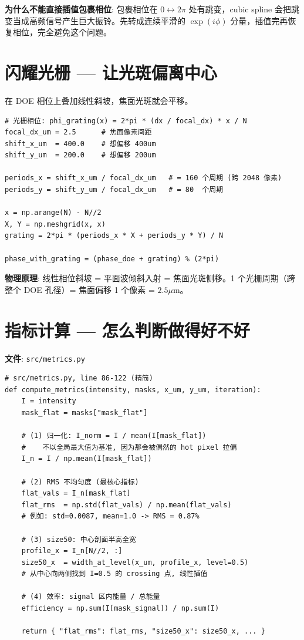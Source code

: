 \documentclass[11pt,a4paper]{ctexart}
\begin{document}
\textbf{为什么不能直接插值包裹相位}: 包裹相位在 $0 \leftrightarrow 2\pi$ 处有跳变，cubic spline 会把跳变当成高频信号产生巨大振铃。先转成连续平滑的 $\exp(i\phi)$ 分量，插值完再恢复相位，完全避免这个问题。

\section{闪耀光栅 — 让光斑偏离中心}

在 DOE 相位上叠加线性斜坡，焦面光斑就会平移。

\begin{lstlisting}
# 光栅相位: phi_grating(x) = 2*pi * (dx / focal_dx) * x / N
focal_dx_um = 2.5      # 焦面像素间距
shift_x_um  = 400.0    # 想偏移 400um
shift_y_um  = 200.0    # 想偏移 200um

periods_x = shift_x_um / focal_dx_um   # = 160 个周期 (跨 2048 像素)
periods_y = shift_y_um / focal_dx_um   # = 80  个周期

x = np.arange(N) - N//2
X, Y = np.meshgrid(x, x)
grating = 2*pi * (periods_x * X + periods_y * Y) / N

phase_with_grating = (phase_doe + grating) % (2*pi)
\end{lstlisting}

\textbf{物理原理}: 线性相位斜坡 = 平面波倾斜入射 = 焦面光斑侧移。1 个光栅周期（跨整个 DOE 孔径）= 焦面偏移 1 个像素 = $2.5\mu\text{m}$。

\section{指标计算 — 怎么判断做得好不好}

\textbf{文件}: \texttt{src/metrics.py}

\begin{lstlisting}
# src/metrics.py, line 86-122 (精简)
def compute_metrics(intensity, masks, x_um, y_um, iteration):
    I = intensity
    mask_flat = masks["mask_flat"]

    # (1) 归一化: I_norm = I / mean(I[mask_flat])
    #    不以全局最大值为基准, 因为那会被偶然的 hot pixel 拉偏
    I_n = I / np.mean(I[mask_flat])

    # (2) RMS 不均匀度 (最核心指标)
    flat_vals = I_n[mask_flat]
    flat_rms  = np.std(flat_vals) / np.mean(flat_vals)
    # 例如: std=0.0087, mean=1.0 -> RMS = 0.87%

    # (3) size50: 中心剖面半高全宽
    profile_x = I_n[N//2, :]
    size50_x  = width_at_level(x_um, profile_x, level=0.5)
    # 从中心向两侧找到 I=0.5 的 crossing 点, 线性插值

    # (4) 效率: signal 区内能量 / 总能量
    efficiency = np.sum(I[mask_signal]) / np.sum(I)

    return { "flat_rms": flat_rms, "size50_x": size50_x, ... }
\end{lstlisting}
\end{document}

